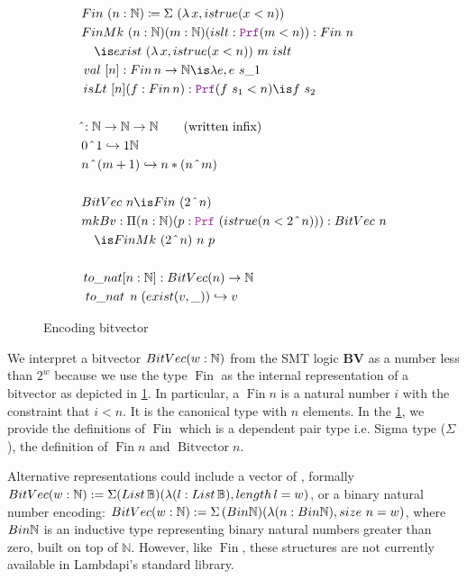 \begin{figure}
\begin{framed}
\begin{align*}
& Fin~(n: \N) \coloneq \Sigma~(\lambda\,x, istrue(x < n)) \\
& FinMk~(n: \N) (m: \N) (islt: \prf (m < n)) : Fin~n \\
&\quad\is exist~(\lambda\,x, istrue(x <n))~m~islt\\
&\mathop{val}~[n]: \mathop{Fin} n \ra \N \is \lambda e, e~s\_1 \\
&\mathop{isLt}~[n] (f: \mathop{Fin} n): \prf (f~s_1 < n) \is f~s_2\\
&\\
& \hat{}: \N \ra \N \ra \N \qquad \text{(written inﬁx)}\\
& 0 ~\hat{}~ 1 \re 1 \N\\
& n ~\hat{}~ (m + 1) \re n * (n ~\hat{}~ m)\\
&\\
&BitVec~n \is Fin~(2~\hat{}~n) \\ 
& mkBv: \Pi(n: \N)(p: \prf~(istrue(n < 2~\hat{}~n))): BitVec~n\\
&\quad\is FinMk~(2~\hat{}~n)~n~p\\
&\\
&\mathop{to\_nat}[n : \mathbb{N}] : \mathop{BitVec}(n) \ra \mathbb{N} \\
&\,\mathop{to\_nat}\;n\;(\mathop{exist}(v,\_))\re v
\end{align*}
\end{framed}
\caption{Encoding bitvector}
\label{fig:bitvector-def}
\end{figure}

We interpret a bitvector $\mathop{BitVec}(w: \mathbb{N})$  from the SMT logic \textbf{BV} as a number less than $2^w$  because we use the type $\mathop{Fin}$ as the internal representation of a bitvector as depicted in \cref{fig:bitvector-def}.
In particular, a $\mathop{Fin} n$ is a natural number $i$ with the constraint that $i < n$. It is the canonical type with $n$ elements. In the \cref{fig:bitvector-def}, we provide the definitions of $\mathop{Fin}$
which is a dependent pair type i.e. Sigma type ($\Sigma$), the definition of $\mathop{Fin} n$ and $\mathop{Bitvector} n$.

Alternative representations could include a vector of \B{},
formally $\mathop{BitVec}(w: \mathbb{N}) := \Sigma(\mathop{List\,\mathbb{B}})(\lambda(l: \mathop{List\,\mathbb{B}}),\mathop{length}l = w)$,
or a binary natural number encoding: $\mathop{BitVec}(w: \mathbb{N}) := \Sigma\,(\mathop{Bin\mathbb{N}})(\lambda (n:\mathop{Bin\mathbb{N}}), \mathop{size}\,n = w)$, where $\mathop{Bin\mathbb{N}}$
is an inductive type representing binary natural numbers greater than zero, built on top of $\mathbb{N}$.
However, like $\mathop{Fin}$, these structures are not currently available in Lambdapi's standard library.

